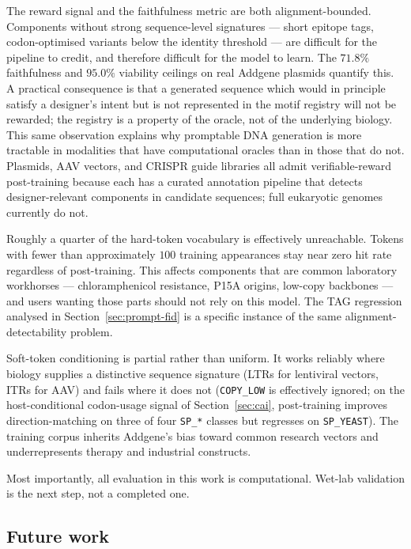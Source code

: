 \documentclass{article}
\begin{document}
The reward signal and the faithfulness metric are both alignment-bounded. Components
without strong sequence-level signatures --- short epitope tags, codon-optimised
variants below the identity threshold --- are difficult for the pipeline to credit, and
therefore difficult for the model to learn. The $71.8\%$ faithfulness and $95.0\%$
viability ceilings on real Addgene plasmids quantify this. A practical consequence is
that a generated sequence which would in principle satisfy a designer's intent but is
not represented in the motif registry will not be rewarded; the registry is a property
of the oracle, not of the underlying biology. This same observation explains why
promptable DNA generation is more tractable in modalities that have computational
oracles than in those that do not. Plasmids, AAV vectors, and CRISPR guide libraries
all admit verifiable-reward post-training because each has a curated annotation
pipeline that detects designer-relevant components in candidate sequences; full
eukaryotic genomes currently do not.

Roughly a quarter of the hard-token vocabulary is effectively unreachable. Tokens with
fewer than approximately $100$ training appearances stay near zero hit rate regardless
of post-training. This affects components that are common laboratory workhorses ---
chloramphenicol resistance, P15A origins, low-copy backbones --- and users wanting
those parts should not rely on this model. The TAG regression analysed in
Section~\ref{sec:prompt-fid} is a specific instance of the same alignment-detectability
problem.

Soft-token conditioning is partial rather than uniform. It works reliably where biology
supplies a distinctive sequence signature (LTRs for lentiviral vectors, ITRs for AAV)
and fails where it does not (\texttt{COPY\_LOW} is effectively ignored; on the
host-conditional codon-usage signal of Section~\ref{sec:cai}, post-training improves
direction-matching on three of four \texttt{SP\_*} classes but regresses on
\texttt{SP\_YEAST}). The training corpus inherits Addgene's bias toward common research
vectors and underrepresents therapy and industrial constructs.

Most importantly, all evaluation in this work is computational. Wet-lab validation is
the next step, not a completed one.

\subsection{Future work}
\end{document}
